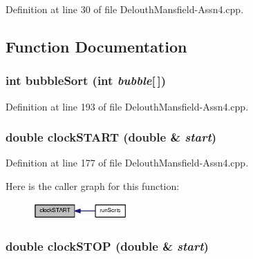 Definition at line 30 of file DelouthMansfield-\/Assn4.cpp.



\subsection{Function Documentation}
\hypertarget{_delouth_mansfield-_assn4_8cpp_a8bb793ac49cd588089713622d18a8c5b}{
\subsubsection[{bubbleSort}]{\setlength{\rightskip}{0pt plus 5cm}int bubbleSort (int {\em bubble}\mbox{[}$\,$\mbox{]})}}
\label{_delouth_mansfield-_assn4_8cpp_a8bb793ac49cd588089713622d18a8c5b}


Definition at line 193 of file DelouthMansfield-\/Assn4.cpp.

\hypertarget{_delouth_mansfield-_assn4_8cpp_a06f37e9c6b6ed29e8670520afd7cb595}{
\subsubsection[{clockSTART}]{\setlength{\rightskip}{0pt plus 5cm}double clockSTART (double \& {\em start})}}
\label{_delouth_mansfield-_assn4_8cpp_a06f37e9c6b6ed29e8670520afd7cb595}


Definition at line 177 of file DelouthMansfield-\/Assn4.cpp.



Here is the caller graph for this function:\nopagebreak
\begin{figure}[H]
\begin{center}
\leavevmode
\includegraphics[width=102pt]{_delouth_mansfield-_assn4_8cpp_a06f37e9c6b6ed29e8670520afd7cb595_icgraph}
\end{center}
\end{figure}


\hypertarget{_delouth_mansfield-_assn4_8cpp_aac62ee236b316f39c25e76417c30c4e7}{
\subsubsection[{clockSTOP}]{\setlength{\rightskip}{0pt plus 5cm}double clockSTOP (double \& {\em start})}}
\label{_delouth_mansfield-_assn4_8cpp_aac62ee236b316f39c25e76417c30c4e7}


